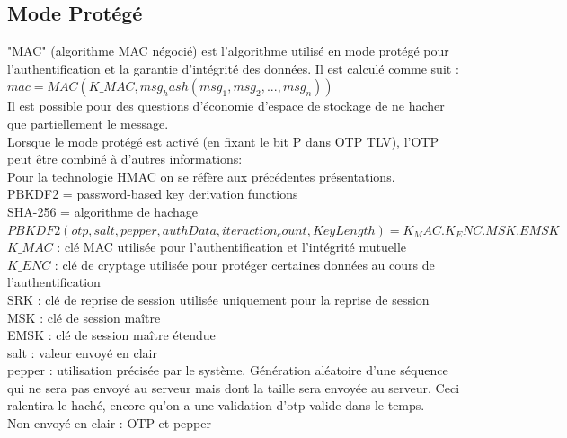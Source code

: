 \documentclass{../res/univ-projet}
\begin{document}
\subsection{Mode Protégé}
"MAC" (algorithme MAC négocié) est l'algorithme utilisé en mode protégé pour l'authentification et la garantie d'intégrité des données.
Il est calculé comme suit : \\
$mac = MAC(K\_MAC, msg_hash(msg_1, msg_2, ..., msg_n))$\\
Il est possible pour des questions d'économie d'espace de stockage de ne hacher que partiellement le message.\\


Lorsque le mode protégé est activé (en fixant le bit P dans OTP TLV), l'OTP peut être combiné à d'autres informations:\\

Pour la technologie HMAC on se réfère aux précédentes présentations.\\
PBKDF2 = password-based key derivation functions\\
SHA-256 = algorithme de hachage\\
$PBKDF2(otp,salt,pepper,authData,iteraction_count,Key Length) = K_MAC.K_ENC.MSK.EMSK$\\


$K\_MAC$ : clé MAC utilisée pour l'authentification et l'intégrité mutuelle\\
$K\_ENC$ : clé de cryptage utilisée pour protéger certaines données au cours de l'authentification\\
SRK : clé de reprise de session utilisée uniquement pour la reprise de session\\
MSK : clé de session maître\\
EMSK : clé de session maître étendue\\
salt : valeur envoyé en clair\\
pepper : utilisation précisée par le système. Génération aléatoire d'une séquence qui ne sera pas envoyé au serveur mais dont la taille sera envoyée au serveur. Ceci ralentira le haché, encore qu'on a une validation d'otp valide dans le temps.\\

Non envoyé en clair : OTP et pepper
\end{document}
